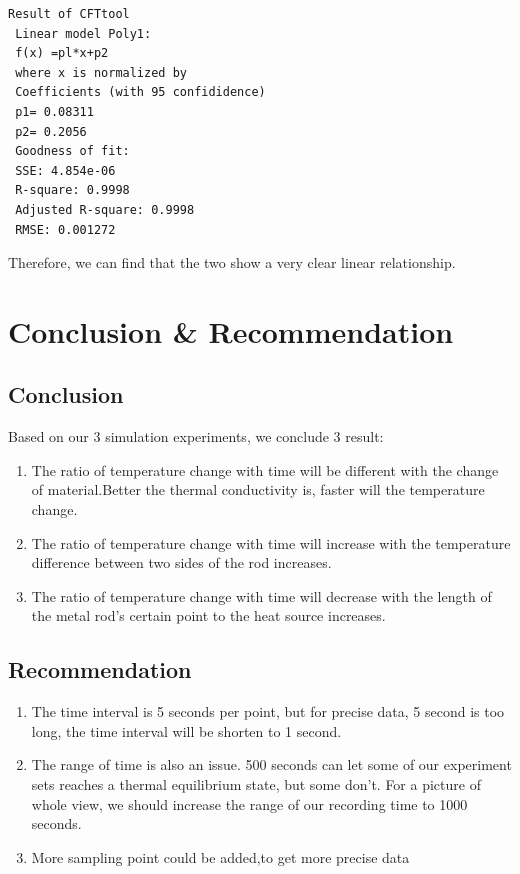 \documentclass[12pt]{article}
\numberwithin{equation}{section}
\begin{document}
 
\begin{lstlisting}
Result of CFTtool
 Linear model Poly1:
 f(x) =pl*x+p2
 where x is normalized by
 Coefficients (with 95 confididence)
 p1= 0.08311
 p2= 0.2056
 Goodness of fit:
 SSE: 4.854e-06
 R-square: 0.9998
 Adjusted R-square: 0.9998
 RMSE: 0.001272
\end{lstlisting}
Therefore, we can find that the two show a very clear linear relationship.













\section{Conclusion \& Recommendation}

\subsection{Conclusion}
Based on our 3 simulation experiments, we conclude 3 result:
\begin{enumerate}
  \item The ratio of temperature change with time will be different with the change of material.Better the thermal conductivity is, faster will the temperature change.
  \item The ratio of temperature change with time will increase with the temperature difference between two sides of the rod increases.
  \item The ratio of temperature change with time will decrease with the length of the metal rod's certain point to the heat source increases.
\end{enumerate}




\subsection{Recommendation}
\begin{enumerate}
  \item The time interval is 5 seconds per point, but for precise data, 5 second is too long, the time interval will be shorten to 1 second.
  \item The range of time is also an issue. 500 seconds can let some of our experiment sets reaches a thermal equilibrium state, but some don’t. For a picture of whole view, we should increase the range of our recording time to 1000 seconds.
  \item More sampling point could be added,to get more precise data
\end{enumerate}
\end{document}
